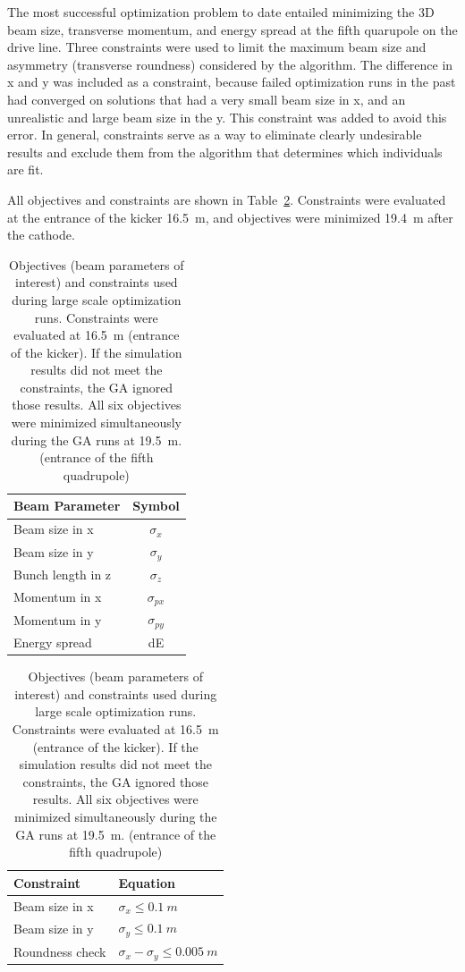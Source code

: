 \label{setup}
The most successful optimization problem to date entailed minimizing the 
3D beam size, transverse momentum, and energy spread at the fifth quarupole on the drive line.
Three constraints were used to limit the maximum beam size and asymmetry (transverse roundness) considered by the algorithm.
The difference in x and y was included as a constraint, because failed optimization runs in the 
past had converged on solutions that had a very small beam size in x, and an unrealistic and large 
beam size in the y. This constraint was added to avoid this error.
In general, constraints serve as a way to eliminate clearly undesirable results and exclude them 
from the algorithm that determines which individuals are fit.

All objectives and constraints are shown in Table~\ref{tab:opt-tba-obj}. 
Constraints were evaluated at the entrance of the kicker \SI{16.5}{m}, and
objectives were minimized \SI{19.4}{m} after the cathode. 
\begin{table}%
	\begin{center}
		\caption{Objectives (beam parameters of interest) and constraints used during large scale optimization runs.
		Constraints were evaluated at \SI{16.5}{m} (entrance of the kicker).
		If the simulation results did not meet the constraints, the GA ignored those results.
		All six objectives were minimized simultaneously during the GA runs at \SI{19.5}{m}.
	(entrance of the fifth quadrupole)}
		\label{tab:opt-tba-obj}
		\begin{tabular}{lc}
			\toprule
			\toprule
			\textbf{Beam Parameter} 	&  \textbf{Symbol} \\ 
			\midrule
			Beam size in x		&  $\sigma_x$ \\
			Beam size in y		&  $\sigma_y$ \\
			Bunch length in z	&  $\sigma_z$ \\
			Momentum in x		&  $\sigma_{px}$ \\
			Momentum in y		&  $\sigma_{py}$\\ 
			Energy spread 		& dE \\
			\bottomrule
		\end{tabular}\hspace{2em}
		\begin{tabular}{ll}
		\toprule
		\toprule
		\textbf{Constraint} 	&  \textbf{Equation} \\ 
		\midrule
		Beam size in x		&  $\sigma_x \leq \SI{0.1}{m}$ \\
		Beam size in y		&  $\sigma_y \leq \SI{0.1}{m}$  \\
		Roundness check		&  $\sigma_x - \sigma_y \leq \SI{0.005}{m}$ \\
		\bottomrule
	\end{tabular}
	\end{center}
\end{table}
